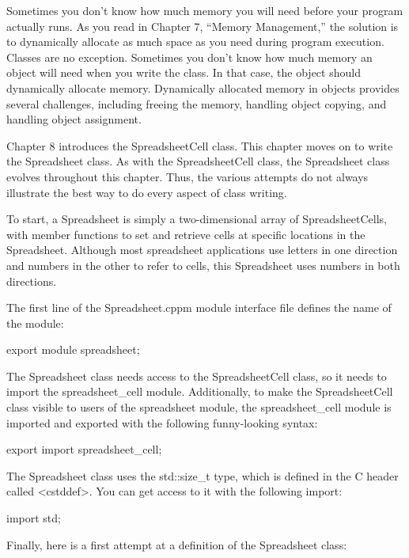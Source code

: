
Sometimes you don’t know how much memory you will need before your program actually runs. As you read in Chapter 7, “Memory Management,” the solution is to dynamically allocate as much space as you need during program execution. Classes are no exception. Sometimes you don’t know how much memory an object will need when you write the class. In that case, the object should dynamically allocate memory. Dynamically allocated memory in objects provides several challenges, including freeing the memory, handling object copying, and handling object assignment.


Chapter 8 introduces the SpreadsheetCell class. This chapter moves on to write the Spreadsheet class. As with the SpreadsheetCell class, the Spreadsheet class evolves throughout this chapter. Thus, the various attempts do not always illustrate the best way to do every aspect of class writing.

To start, a Spreadsheet is simply a two-dimensional array of SpreadsheetCells, with member functions to set and retrieve cells at specific locations in the Spreadsheet. Although most spreadsheet applications use letters in one direction and numbers in the other to refer to cells, this Spreadsheet uses numbers in both directions.

The first line of the Spreadsheet.cppm module interface file defines the name of the module:

\begin{cpp}
export module spreadsheet;
\end{cpp}

The Spreadsheet class needs access to the SpreadsheetCell class, so it needs to import the spreadsheet\_cell module. Additionally, to make the SpreadsheetCell class visible to users of the spreadsheet module, the spreadsheet\_cell module is imported and exported with the following funny-looking syntax:

\begin{cpp}
export import spreadsheet_cell;
\end{cpp}

The Spreadsheet class uses the std::size\_t type, which is defined in the C header called <cstddef>. You can get access to it with the following import:

\begin{cpp}
import std;
\end{cpp}

Finally, here is a first attempt at a definition of the Spreadsheet class:

